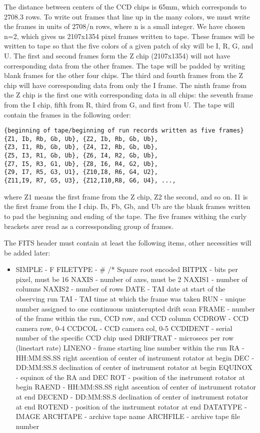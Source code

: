 	The distance between centers of the CCD chips is 65mm, which
corresponds to 2708.3 rows.  To write out frames that line up in
the many colors, we must write the frames in units of 2708/n rows, where
n is a small integer.  We have chosen n=2, which gives us
2107x1354 pixel frames written to tape.  These frames will be written
to tape so that the five colors of a given patch of sky will be
I, R, G, and U.  The first and second frames form the Z chip (2107x1354)
will not have corresponding data from the other frames.  The tape will
be padded by writing blank frames for the other four chips.  The third
and fourth frames from the Z chip will have corresponding data from only
the I frame.  The ninth frame from the Z chip is the first one with
corresponding data in all chips: the seventh frame from the I chip,
fifth from R, third from G, and first from U.  The tape will contain
the frames in the following order:
\begin{verbatim}
{beginning of tape/beginning of run records written as five frames}
{Z1, Ib, Rb, Gb, Ub}, {Z2, Ib, Rb, Gb, Ub},
{Z3, I1, Rb, Gb, Ub}, {Z4, I2, Rb, Gb, Ub},
{Z5, I3, R1, Gb, Ub}, {Z6, I4, R2, Gb, Ub},
{Z7, I5, R3, G1, Ub}, {Z8, I6, R4, G2, Ub},
{Z9, I7, R5, G3, U1}, {Z10,I8, R6, G4, U2},
{Z11,I9, R7, G5, U3}, {Z12,I10,R8, G6, U4}, ...,
\end{verbatim}
where Z1 means the first frame from the Z chip, Z2 the second, and so on.
I1 is the first frame from the I chip.  Ib, Fb, Gb, and Ub are the blank
frames written to pad the beginning and ending of the tape.  The five
frames withing the curly brackets arer read as a corressponding group
of frames.


	The FITS header must contain at least the following items, other
necessities will be added later:
\begin{itemize}
\item SIMPLE - F
\sitem FILETYPE - \#		/* Square root encoded
\sitem BITPIX - bits per pixel, must be 16
\sitem NAXIS - number of axes, must be 2
\sitem NAXIS1 - number of columns
\sitem NAXIS2 - number of rows
\sitem DATE - TAI date at start of the observing run
\sitem TAI - TAI time at which the frame was taken
\sitem RUN - unique number assigned to one continuous uninterupted drift scan
\sitem FRAME - number of the frame within the run, CCD row, and CCD column
\sitem CCDROW - CCD camera row, 0-4
\sitem CCDCOL - CCD camera col, 0-5 
\sitem CCDIDENT - serial number of the specific CCD chip used
\sitem DRIFTRAT - microsecs per row (linestart rate)
\sitem LINENO - frame starting line number within the run
\sitem RA - HH:MM:SS.SS right ascention of center of instrument rotator at begin
\sitem DEC - DD:MM:SS.S declination of center of instrument rotator at begin
\sitem EQUINOX - equinox of the RA and DEC
\sitem ROT - position of the instrument rotator at begin
\sitem RAEND - HH:MM:SS.SS right ascention of center of instrument rotator at end
\sitem DECEND - DD:MM:SS.S declination of center of instrument rotator at end
\sitem ROTEND - position of the instrument rotator at end
\sitem DATATYPE - IMAGE
\sitem ARCHTAPE - archive tape name
\sitem ARCHFILE - archive tape file number
\end{itemize}

